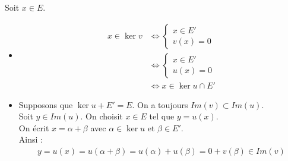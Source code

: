 \documentclass[../main.tex]{subfiles}
\begin{document}
\noindent Soit $x\in E$. 
\begin{itemize}
    \item \begin{align*}
        x \in \ker v &\Leftrightarrow \begin{cases}
            x \in E' \\
            v(x) = 0
        \end{cases} \\
        &\Leftrightarrow \begin{cases}
            x \in E' \\
            u(x) = 0
        \end{cases} \\
        &\Leftrightarrow x \in \ker u \cap E'
    \end{align*}

    \item Supposons que $\ker u + E' = E$. On a toujours $Im(v) \subset Im(u)$. \\
    Soit $y\in Im(u)$. On choisit $x\in E$ tel que $y = u(x)$. \\
    On écrit $x = \alpha + \beta$ avec $\alpha \in \ker u$ et $\beta \in E'$. \\
    Ainsi :
    \begin{align*}
        y = u(x) = u(\alpha  + \beta) = u(\alpha) + u(\beta) = 0 + v(\beta) \in Im(v)
    \end{align*}
\end{itemize}
\end{document}
